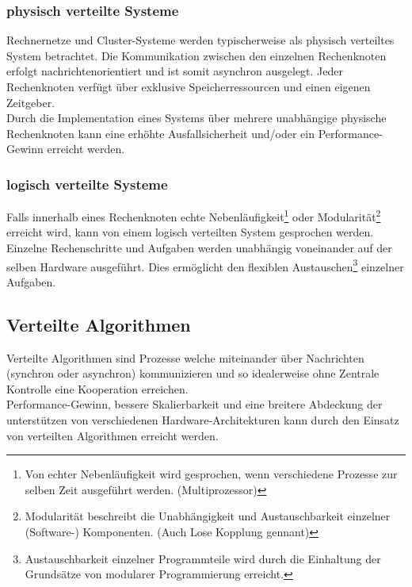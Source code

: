 \documentclass[oneside,11pt,parskip=half,ngerman]{scrreprt}
\begin{document}
\subsubsection{physisch verteilte
Systeme}\label{physisch-verteilte-systeme}

Rechnernetze und Cluster-Systeme werden typischerweise als physisch
verteiltes System betrachtet. Die Kommunikation zwischen den einzelnen
Rechenknoten erfolgt nachrichtenorientiert und ist somit asynchron
ausgelegt. Jeder Rechenknoten verfügt über exklusive Speicherressourcen
und einen eigenen Zeitgeber.\\Durch die Implementation eines Systems
über mehrere unabhängige physische Rechenknoten kann eine erhöhte
Ausfallsicherheit und/oder ein Performance-Gewinn erreicht werden.

\subsubsection{logisch verteilte
Systeme}\label{logisch-verteilte-systeme}

Falls innerhalb eines Rechenknoten echte Nebenläufigkeit\footnote{Von
  echter Nebenläufigkeit wird gesprochen, wenn verschiedene Prozesse zur
  selben Zeit ausgeführt werden. (Multiprozessor)} oder
Modularität\footnote{Modularität beschreibt die Unabhängigkeit und
  Austauschbarkeit einzelner (Software-) Komponenten. (Auch Lose
  Kopplung gennant)} erreicht wird, kann von einem logisch verteilten
System gesprochen werden. Einzelne Rechenschritte und Aufgaben werden
unabhängig voneinander auf der selben Hardware ausgeführt. Dies
ermöglicht den flexiblen Austauschen\footnote{Austauschbarkeit einzelner
  Programmteile wird durch die Einhaltung der Grundsätze von modularer
  Programmierung erreicht.} einzelner Aufgaben.

\subsection{Verteilte Algorithmen}\label{verteilte-algorithmen}

Verteilte Algorithmen sind Prozesse welche miteinander über Nachrichten
(synchron oder asynchron) kommunizieren und so idealerweise ohne
Zentrale Kontrolle eine Kooperation erreichen.
\autocite{ethdistribalgo}\\Performance-Gewinn, bessere Skalierbarkeit
und eine breitere Abdeckung der unterstützen von verschiedenen
Hardware-Architekturen kann durch den Einsatz von verteilten Algorithmen
erreicht werden.
\end{document}
